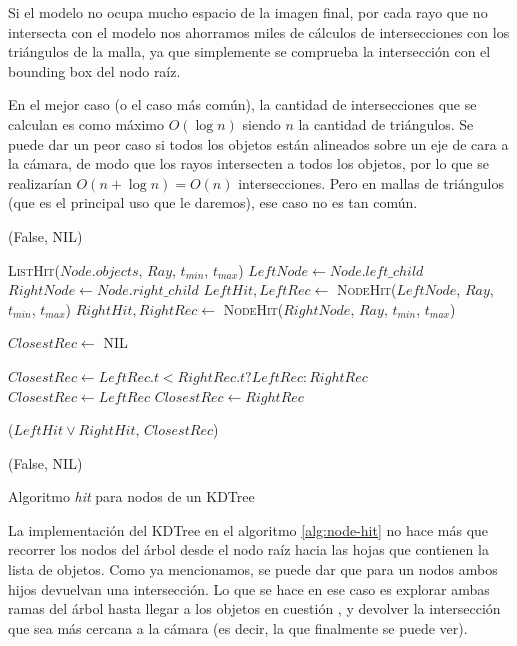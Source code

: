 Si el modelo no ocupa mucho espacio de la imagen final, por cada rayo que no
intersecta con el modelo nos ahorramos miles de cálculos de intersecciones con
los triángulos de la malla, ya que simplemente se comprueba la intersección con
el bounding box del nodo raíz.

En el mejor caso (o el caso más común), la cantidad de intersecciones que se
calculan es como máximo $O(\log n)$ siendo $n$ la cantidad de triángulos. Se
puede dar un peor caso si todos los objetos están alineados sobre un eje de cara
a la cámara, de modo que los rayos intersecten a todos los objetos, por lo que
se realizarían $O(n+\log n)=O(n)$ intersecciones. Pero en mallas de triángulos
(que es el principal uso que le daremos), ese caso no es tan común.

\begin{algorithm}
\begin{algorithmic}[1]
        \State \Return (False, NIL)
    \EndIf

    \State \Return \textsc{ListHit}($Node.objects$, $Ray$, $t_{min}$, $t_{max}$)
    \Else
        \State $LeftNode \gets Node.left\_child$ 
        \State $RightNode \gets Node.right\_child$ 
        \State $LeftHit, LeftRec \gets$ \textsc{NodeHit}($LeftNode$, $Ray$,
        $t_{min}$, $t_{max}$)
        \State $RightHit, RightRec \gets$ \textsc{NodeHit}($RightNode$, $Ray$,
        $t_{min}$, $t_{max}$)

        \State $ClosestRec \gets$ NIL

            \State $ClosestRec \gets LeftRec.t < RightRec.t ? LeftRec : RightRec$
            \State $ClosestRec \gets LeftRec$
            \State $ClosestRec \gets RightRec$
        \EndIf

        \State \Return ($LeftHit \lor RightHit$, $ClosestRec$)
    \EndIf


    \State \Return (False, NIL)
\EndFunction
\end{algorithmic}
\caption{Algoritmo \textit{hit} para nodos de un KDTree}
\label{alg:node-hit}
\end{algorithm}

La implementación del KDTree en el algoritmo \ref{alg:node-hit} no hace más que
recorrer los nodos del árbol desde el nodo raíz hacia las hojas que contienen la
lista de objetos. Como ya mencionamos, se puede dar que para un nodos ambos
hijos devuelvan una intersección. Lo que se hace en ese caso es explorar ambas
ramas del árbol hasta llegar a los objetos en cuestión , y devolver la
intersección que sea más cercana a la cámara (es decir, la que finalmente se
puede ver).

